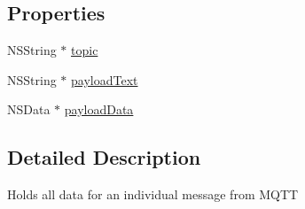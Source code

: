 \subsection*{Properties}
\begin{DoxyCompactItemize}
\item 
N\+S\+String $\ast$ \hyperlink{interface_c_b_message_a5fef01f2b51495307023ad95e772c632}{topic}
\item 
N\+S\+String $\ast$ \hyperlink{interface_c_b_message_a40254070a83d97673d850d08437fc44b}{payload\+Text}
\item 
N\+S\+Data $\ast$ \hyperlink{interface_c_b_message_a11c9f8c3e5d3e137f6d735ffb3fa7560}{payload\+Data}
\end{DoxyCompactItemize}


\subsection{Detailed Description}
Holds all data for an individual message from M\+Q\+T\+T 

